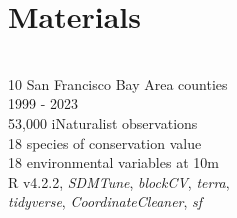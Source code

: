 \documentclass[a0paper,fleqn]{betterposter}
\begin{document}
{\section{Materials}
\def\iconspace{2mm}
\vspace{-15mm}
\\\faMapO   \hspace{1cm} 10 San Francisco Bay Area counties
\vspace{\iconspace}
\\\faClockO \hspace{1cm} 1999 - 2023
\vspace{\iconspace}
\\\faMapMarker \hspace{1.3cm} 53,000 iNaturalist observations
\vspace{\iconspace}
\\\faLeaf \hspace{1cm} 18 species of conservation value
\vspace{\iconspace}
\\\faSunO \hspace{.9cm} 18 environmental variables at 10m
\vspace{\iconspace}
\\\faCode \hspace{1cm} R v4.2.2, \textit{SDMTune}, \textit{blockCV}, \textit{terra}, 
\\ \hspace*{2.1cm} \textit{tidyverse}, \textit{CoordinateCleaner}, \textit{sf}


}
\end{document}
